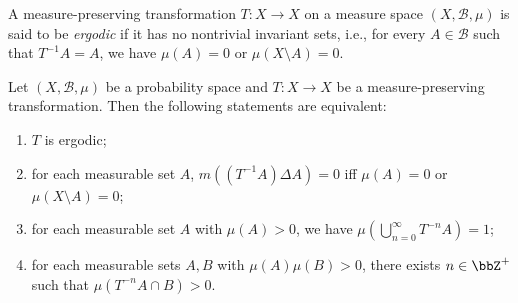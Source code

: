     \begin{definition}\label{def:ergodic_transformation}
        A measure-preserving transformation \(T:X\to X\) on a measure space \((X, \mathcal{B}, \mu)\) is said to be \emph{ergodic} if it has no nontrivial invariant sets, i.e., for every \(A\in \mathcal{B}\) such that \(T^{-1}A = A\), we have \(\mu(A) = 0\) or \(\mu(X\setminus A) = 0\).
        
    \end{definition}

    \begin{theorem}\label{thm:characterization_of_ergodic_transformation}
        Let \((X, \mathcal{B}, \mu)\) be a probability space and \(T:X\to X\) be a measure-preserving transformation. 
        Then the following statements are equivalent:
        \begin{enumerate}
            \item \(T\) is ergodic;
            \item for each measurable set \(A\), \(m((T^{-1}A) \Delta A) = 0\) iff \(\mu(A) = 0\) or \(\mu(X\setminus A) = 0\);
            \item for each measurable set \(A\) with \(\mu(A) > 0\), we have \(\mu\left(\bigcup_{n=0}^\infty T^{-n}A\right) = 1\);
            \item for each measurable sets \(A, B\) with \(\mu(A)\mu(B) > 0\), there exists \(n\in \bbZ^+\) such that \(\mu(T^{-n}A \cap B) > 0\).
        \end{enumerate}
    \end{theorem}


